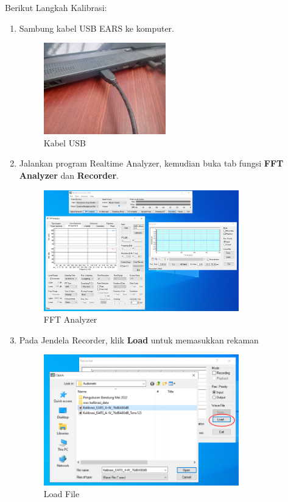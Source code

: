 \documentclass[12pt]{book}
\begin{document}
    Berikut Langkah Kalibrasi:
    \begin{enumerate}
    	\item Sambung kabel USB EARS ke komputer.
    	\begin{figure}[!ht]
    		\centering
    		\includegraphics[width=0.5\textwidth]{images/pasang/laptop_ears}
    		\caption{Kabel USB}
    	\end{figure}

    	\newpage
    	\item Jalankan program Realtime Analyzer, kemudian buka tab fungsi \textbf{FFT Analyzer} dan \textbf{Recorder}.
    	\begin{figure}[!ht]
    		\centering
    		\includegraphics[width=0.8\textwidth]{images/kalibrasi/fft_analyzer}
    		\caption{FFT Analyzer}
    	\end{figure}

    	\item Pada Jendela Recorder, klik \textbf{Load} untuk memasukkan rekaman
    	\begin{figure}[!ht]
    		\centering
    		\includegraphics[width=0.8\textwidth]{images/kalibrasi/load_file}
    		\caption{Load File}
    	\end{figure}


\end{enumerate}
\end{document}
